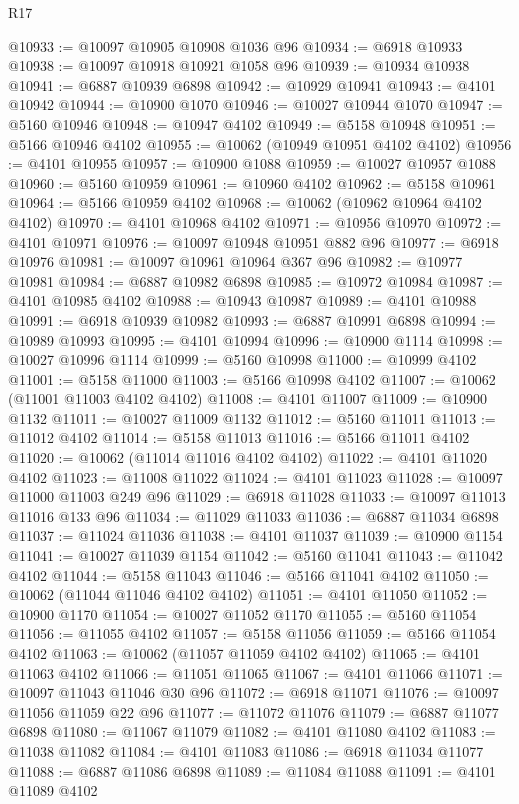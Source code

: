 \begin{lexlean}{R17}
\begin{coremodule}
@10933 := @10097 @10905 @10908 @1036 @96
@10934 := @6918 @10933
@10938 := @10097 @10918 @10921 @1058 @96
@10939 := @10934 @10938
@10941 := @6887 @10939 @6898
@10942 := @10929 @10941
@10943 := @4101 @10942
@10944 := @10900 @1070
@10946 := @10027 @10944 @1070
@10947 := @5160 @10946
@10948 := @10947 @4102
@10949 := @5158 @10948
@10951 := @5166 @10946 @4102
@10955 := @10062 (@10949 @10951 @4102 @4102)
@10956 := @4101 @10955
@10957 := @10900 @1088
@10959 := @10027 @10957 @1088
@10960 := @5160 @10959
@10961 := @10960 @4102
@10962 := @5158 @10961
@10964 := @5166 @10959 @4102
@10968 := @10062 (@10962 @10964 @4102 @4102)
@10970 := @4101 @10968 @4102
@10971 := @10956 @10970
@10972 := @4101 @10971
@10976 := @10097 @10948 @10951 @882 @96
@10977 := @6918 @10976
@10981 := @10097 @10961 @10964 @367 @96
@10982 := @10977 @10981
@10984 := @6887 @10982 @6898
@10985 := @10972 @10984
@10987 := @4101 @10985 @4102
@10988 := @10943 @10987
@10989 := @4101 @10988
@10991 := @6918 @10939 @10982
@10993 := @6887 @10991 @6898
@10994 := @10989 @10993
@10995 := @4101 @10994
@10996 := @10900 @1114
@10998 := @10027 @10996 @1114
@10999 := @5160 @10998
@11000 := @10999 @4102
@11001 := @5158 @11000
@11003 := @5166 @10998 @4102
@11007 := @10062 (@11001 @11003 @4102 @4102)
@11008 := @4101 @11007
@11009 := @10900 @1132
@11011 := @10027 @11009 @1132
@11012 := @5160 @11011
@11013 := @11012 @4102
@11014 := @5158 @11013
@11016 := @5166 @11011 @4102
@11020 := @10062 (@11014 @11016 @4102 @4102)
@11022 := @4101 @11020 @4102
@11023 := @11008 @11022
@11024 := @4101 @11023
@11028 := @10097 @11000 @11003 @249 @96
@11029 := @6918 @11028
@11033 := @10097 @11013 @11016 @133 @96
@11034 := @11029 @11033
@11036 := @6887 @11034 @6898
@11037 := @11024 @11036
@11038 := @4101 @11037
@11039 := @10900 @1154
@11041 := @10027 @11039 @1154
@11042 := @5160 @11041
@11043 := @11042 @4102
@11044 := @5158 @11043
@11046 := @5166 @11041 @4102
@11050 := @10062 (@11044 @11046 @4102 @4102)
@11051 := @4101 @11050
@11052 := @10900 @1170
@11054 := @10027 @11052 @1170
@11055 := @5160 @11054
@11056 := @11055 @4102
@11057 := @5158 @11056
@11059 := @5166 @11054 @4102
@11063 := @10062 (@11057 @11059 @4102 @4102)
@11065 := @4101 @11063 @4102
@11066 := @11051 @11065
@11067 := @4101 @11066
@11071 := @10097 @11043 @11046 @30 @96
@11072 := @6918 @11071
@11076 := @10097 @11056 @11059 @22 @96
@11077 := @11072 @11076
@11079 := @6887 @11077 @6898
@11080 := @11067 @11079
@11082 := @4101 @11080 @4102
@11083 := @11038 @11082
@11084 := @4101 @11083
@11086 := @6918 @11034 @11077
@11088 := @6887 @11086 @6898
@11089 := @11084 @11088
@11091 := @4101 @11089 @4102

\end{coremodule}
\end{lexlean}
